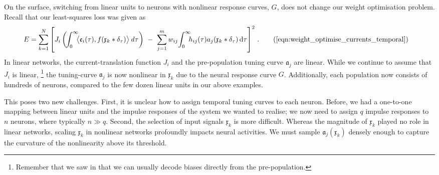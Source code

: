 On the surface, switching from linear units to neurons with nonlinear response curves, $G$, does not change our weight optimisation problem.
Recall that our least-squares loss was given as
\begin{align}
	E &= \sum_{k = 1}^N \left[
		J_i \left( \! \int_0^\infty \!\!\! \big\langle \mathfrak{e}_i(\tau), f(\mathfrak{x}_k \ast \delta_\tau) \big\rangle \, \mathit{d\tau} \right) \,\,-\,\,
		\sum_{j = 1}^m w_{ij} \! \int_0^\infty \!\!\! h_{ij}(\tau) a_j(\mathfrak{x}_k \ast \delta_\tau) \,\mathrm{d}\tau
	\right]^2 \,.
	\tag{\ref{eqn:weight_optimise_currents_temporal}}
\end{align}
In linear networks, the current-translation function $J_i$ and the pre-population tuning curve $\mathfrak{a}_j$ are linear.
While we continue to assume that $J_i$ is linear,%
\footnote{
Remember that we saw in  that we can usually decode biases directly from the pre-population.
}
the tuning-curve $\mathfrak{a}_j$ is now nonlinear in $\mathfrak{x}_k$ due to the neural response curve $G$.
Additionally, each population now consists of hundreds of neurons, compared to the few dozen linear units in our above examples.

This poses two new challenges.
First, it is unclear how to assign temporal tuning curves to each neuron.
Before, we had a one-to-one mapping between linear units and the impulse responses of the \LTI system we wanted to realise; we now need to assign $q$ impulse responses to $n$ neurons, where typically $n \gg q$.
Second, the selection of input signals $\mathfrak{x}_k$ is more difficult.
Whereas the magnitude of $\mathfrak{x}_k$ played no role in linear networks, scaling $\mathfrak{x}_k$ in nonlinear networks profoundly impacts neural activities.
We must sample $\mathfrak{a}_j(\mathfrak{x}_k)$ densely enough to capture the curvature of the nonlinearity above its threshold.



